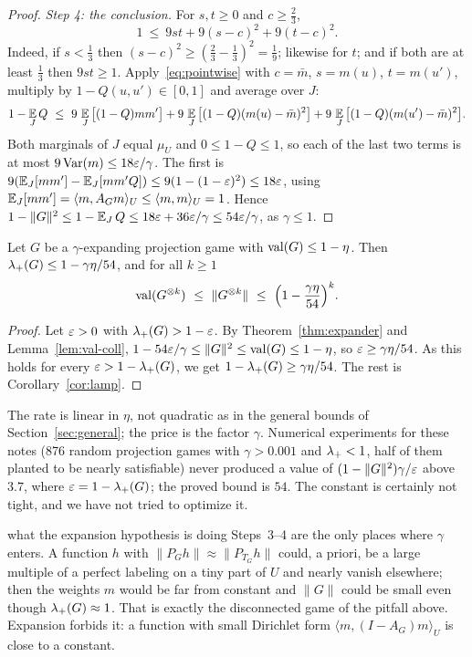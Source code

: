 \begin{proof}
\emph{Step 4: the conclusion.}  For $s,t\ge0$ and $c\ge\frac23$,
\begin{equation}\label{eq:pointwise}
  1\ \le\ 9st+9(s-c)^2+9(t-c)^2 .
\end{equation}
Indeed, if $s<\frac13$ then $(s-c)^2\ge(\frac23-\frac13)^2=\frac19$; likewise for $t$; and if both are at least $\frac13$ then $9st\ge1$.
Apply~\eqref{eq:pointwise} with $c=\bar m$, $s=m(u)$, $t=m(u')$, multiply by $1-Q(u,u')\in[0,1]$ and average over $J$:
\[
  1-\E_JQ\ \le\ 9\,\E_J\big[(1-Q)mm'\big]+9\,\E_J\big[(1-Q)(m(u)-\bar m)^2\big]+9\,\E_J\big[(1-Q)(m(u')-\bar m)^2\big].
\]
Both marginals of $J$ equal $\mu_U$ and $0\le1-Q\le1$, so each of the last two terms is at most $9\,\mathrm{Var}(m)\le18\varepsilon/\gamma$.  The first is $9(\operatorname*{\mathbb{E}}_J[mm']-\operatorname*{\mathbb{E}}_J[mm'Q])\le9(1-(1-\varepsilon)^2)\le18\varepsilon$, using $\operatorname*{\mathbb{E}}_J[mm']=\langle m,A_Gm\rangle_U\le\langle m,m\rangle_U=1$.
Hence $1-\|G\|^2\le1-\operatorname*{\mathbb{E}}_JQ\le18\varepsilon+36\varepsilon/\gamma\le54\varepsilon/\gamma$, as $\gamma\le1$.
\end{proof}

\begin{corollary}\label{cor:expander}
Let $G$ be a $\gamma$-expanding projection game with $\operatorname{val}(G)\le1-\eta$.  Then $\lambda_{+}(G)\le1-\gamma\eta/54$, and for all $k\ge1$
\[
  \operatorname{val}(G^{\otimes k})\ \le\ \|G^{\otimes k}\|\ \le\ \Big(1-\frac{\gamma\eta}{54}\Big)^k .
\]
\end{corollary}
\begin{proof}
Let $\varepsilon>0$ with $\lambda_{+}(G)>1-\varepsilon$.  By Theorem~\ref{thm:expander} and Lemma~\ref{lem:val-coll}, $1-54\varepsilon/\gamma\le\|G\|^2\le\operatorname{val}(G)\le1-\eta$, so $\varepsilon\ge\gamma\eta/54$.  As this holds for every $\varepsilon>1-\lambda_{+}(G)$, we get $1-\lambda_{+}(G)\ge\gamma\eta/54$.  The rest is Corollary~\ref{cor:lamp}.
\end{proof}

\noindent
The rate is linear in $\eta$, not quadratic as in the general bounds of Section~\ref{sec:general}; the price is the factor $\gamma$.  Numerical experiments for these notes (876 random projection games with $\gamma>0.001$ and $\lambda_{+}<1$, half of them planted to be nearly satisfiable) never produced a value of $(1-\|G\|^2)\gamma/\varepsilon$ above $3.7$, where $\varepsilon=1-\lambda_{+}(G)$; the proved bound is $54$.  The constant is certainly not tight, and we have not tried to optimize it.

\begin{pitfall}{what the expansion hypothesis is doing}
Steps~3--4 are the only places where $\gamma$ enters.  A function $h$ with $\|P_Gh\|\approx\|P_{T_G}h\|$ could, a priori, be a large multiple of a perfect labeling on a tiny part of $U$ and nearly vanish elsewhere; then the weights $m$ would be far from constant and $\|G\|$ could be small even though $\lambda_{+}(G)\approx1$.
That is exactly the disconnected game of the pitfall above.  Expansion forbids it: a function with small Dirichlet form $\langle m,(I-A_G)m\rangle_U$ is close to a constant.
\end{pitfall}


